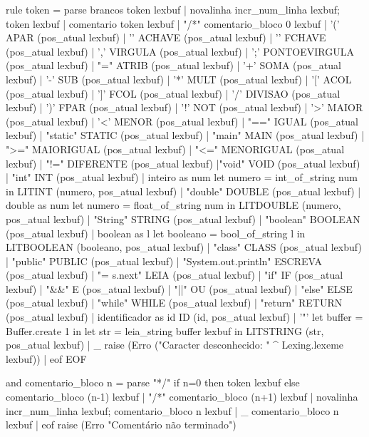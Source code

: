 \documentclass[12pt,a4paper,twoside]{report}
\begin{document}
\begin{terminal}
rule token = parse
  brancos    { token lexbuf }
| novalinha  { incr_num_linha lexbuf; token lexbuf }
| comentario { token lexbuf }
| "/*"       { comentario_bloco 0 lexbuf }
| '('        { APAR (pos_atual lexbuf) }
| '{'        { ACHAVE (pos_atual lexbuf) }
| '}'        { FCHAVE (pos_atual lexbuf) }
| ','	     { VIRGULA (pos_atual lexbuf) }
| ';'        { PONTOEVIRGULA (pos_atual lexbuf) }
| "="	     { ATRIB (pos_atual lexbuf) }
| '+'        { SOMA (pos_atual lexbuf) }
| '-'	     { SUB (pos_atual lexbuf) }
| '*'	     { MULT (pos_atual lexbuf) }
| '['	     { ACOL (pos_atual lexbuf) }
| ']'	     { FCOL (pos_atual lexbuf) }
| '/'	     { DIVISAO (pos_atual lexbuf) }
| ')'        { FPAR (pos_atual lexbuf) }
| '!'        { NOT (pos_atual lexbuf) }
| '>'	     { MAIOR (pos_atual lexbuf) }
| '<'	     { MENOR (pos_atual lexbuf) }
| "=="     { IGUAL (pos_atual lexbuf) }
| "static"  { STATIC (pos_atual lexbuf) }
| "main"  { MAIN (pos_atual lexbuf) }
| ">="	     { MAIORIGUAL (pos_atual lexbuf) }
| "<="	     { MENORIGUAL (pos_atual lexbuf) }
| "!="	     { DIFERENTE (pos_atual lexbuf) }
|"void" { VOID (pos_atual lexbuf) }
| "int"  { INT (pos_atual lexbuf) }
| inteiro as num { let numero = int_of_string num in 
                    LITINT (numero, pos_atual lexbuf)  } 
| "double"     { DOUBLE (pos_atual lexbuf) }
| double as num { let numero = float_of_string num in
		  LITDOUBLE (numero, pos_atual lexbuf) }
| "String" { STRING (pos_atual lexbuf) }
| "boolean"   { BOOLEAN (pos_atual lexbuf) }
| boolean as l { let booleano = bool_of_string l in
		  LITBOOLEAN (booleano, pos_atual lexbuf) }
| "class" { CLASS (pos_atual lexbuf) }
| "public"	     { PUBLIC (pos_atual lexbuf) }
| "System.out.println" { ESCREVA (pos_atual lexbuf) }
| "= s.next"     { LEIA (pos_atual lexbuf) }
| "if"       { IF (pos_atual lexbuf) }
| "&&"	     { E (pos_atual lexbuf) }
| "||"	     { OU (pos_atual lexbuf) }
| "else"    { ELSE (pos_atual lexbuf) }
| "while"    { WHILE (pos_atual lexbuf) }
| "return"   { RETURN (pos_atual lexbuf) }
| identificador as id { ID (id, pos_atual lexbuf) }
| '"'   { let buffer = Buffer.create 1 in
            let str = leia_string buffer lexbuf in
               LITSTRING (str, pos_atual lexbuf) }
| _ { raise (Erro ("Caracter desconhecido: " ^ Lexing.lexeme lexbuf)) }
| eof        { EOF }

and comentario_bloco n = parse
   "*/"      { if n=0 then token lexbuf 
               else comentario_bloco (n-1) lexbuf }
| "/*"       { comentario_bloco (n+1) lexbuf }
| novalinha  { incr_num_linha lexbuf; comentario_bloco n lexbuf }
| _          { comentario_bloco n lexbuf }
| eof        { raise (Erro "Comentário não terminado") }


\end{terminal}
\end{document}

